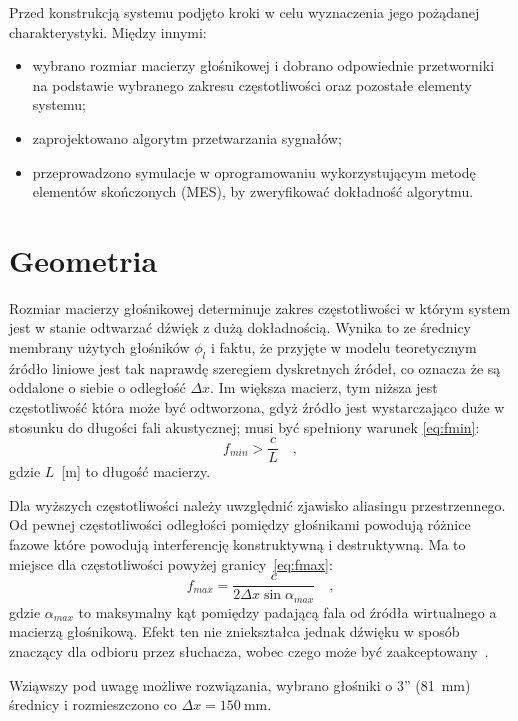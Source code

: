 \documentclass[12pt]{oska}
\let\Oldsection\section
\renewcommand{\section}{\FloatBarrier\Oldsection}
\begin{document}
Przed konstrukcją systemu podjęto kroki w celu wyznaczenia jego pożądanej
charakterystyki. Między innymi:
\begin{itemize}
  \item wybrano rozmiar macierzy głośnikowej i dobrano odpowiednie przetworniki
  na podstawie wybranego zakresu częstotliwości oraz pozostałe elementy systemu;
  \item zaprojektowano algorytm przetwarzania sygnałów;
  \item przeprowadzono symulacje w oprogramowaniu wykorzystującym metodę
    elementów skończonych (MES), by zweryfikować dokładność algorytmu.
\end{itemize}

\section{Geometria}

Rozmiar macierzy głośnikowej determinuje zakres częstotliwości w którym system
jest w stanie odtwarzać dźwięk z dużą dokładnością. Wynika to ze średnicy
membrany użytych głośników $\phi_l$ i faktu, że przyjęte w modelu teoretycznym źródło liniowe jest
tak naprawdę szeregiem dyskretnych źródeł, co oznacza że są oddalone o siebie o
odległość $\Delta x$. Im większa macierz, tym niższa jest częstotliwość która
może być odtworzona, gdyż źródło jest wystarczająco duże w stosunku do długości
fali akustycznej; musi być spełniony warunek \eqref{eq:fmin}:
\begin{equation}
  f_{min}>\frac{c}{L} \quad,	\label{eq:fmin}
\end{equation}
gdzie $L$~[m] to długość macierzy. 

Dla wyższych częstotliwości należy
uwzględnić zjawisko aliasingu przestrzennego. Od pewnej częstotliwości
odległości pomiędzy głośnikami powodują różnice fazowe które powodują
interferencję konstruktywną i destruktywną. Ma to miejsce dla częstotliwości
powyżej granicy~\eqref{eq:fmax}:
\begin{equation}
  f_{max}=\frac{c}{2\Delta x \sin{\alpha_{max}}} \quad, \label{eq:fmax}
\end{equation}
gdzie $\alpha_{max}$ to maksymalny kąt pomiędzy padającą fala od źródła wirtualnego a
macierzą głośnikową. Efekt ten nie zniekształca jednak dźwięku w sposób znaczący dla odbioru przez słuchacza,
wobec czego może być zaakceptowany~\cite{hq_rendering}.

Wziąwszy pod uwagę możliwe rozwiązania, wybrano głośniki o 3''
(\SI{81}{\milli\meter}) średnicy i rozmieszczono co
$\Delta x=\SI{150}{\milli\meter}$.
\end{document}
